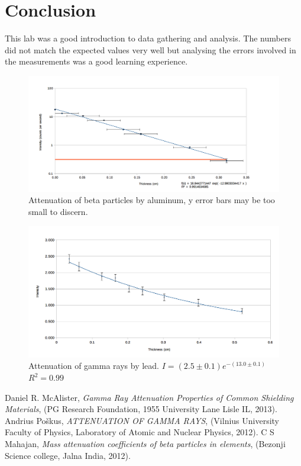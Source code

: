 \documentclass[twocolumn,secnumarabic,amssymb, nobibnotes, aps, pra]{revtex4}
\begin{document}
\section{Conclusion}

This lab was a good introduction to data gathering and analysis. The numbers did not match the expected values very well but analysing the errors involved in the measurements was a good learning experience. 


\begin{figure}[b]
\begin{center}
\includegraphics[scale=0.7]{BetaDataAnalysis.png}
\end{center}
\caption{Attenuation of beta particles by aluminum, y error bars may be too small to discern.}
\label{fig:beta}
\end{figure}

\begin{figure}[b]
\begin{center}
\includegraphics[scale=.7]{GammaDataAnalysis.png}
\end{center}
\caption{Attenuation of gamma rays by lead.  $I = (2.5 \pm 0.1)e^{-(13.0 \pm 0.1) }$ $R^2 = 0.99$}
\label{fig:gamma}
\end{figure}

\begin{thebibliography}{5}
 Daniel R. McAlister, \textit{Gamma Ray Attenuation Properties of Common Shielding Materials}, (PG Research Foundation, 1955 University Lane Lisle IL, 2013).
 Andrius Poškus, \textit{ATTENUATION OF GAMMA RAYS}, (Vilnius University Faculty of Physics, Laboratory of Atomic and Nuclear Physics, 2012).
 C S Mahajan, \textit{Mass attenuation coefficients of beta particles in elements}, (Bezonji Science college, Jalna India, 2012).
\end{thebibliography}
\end{document}
